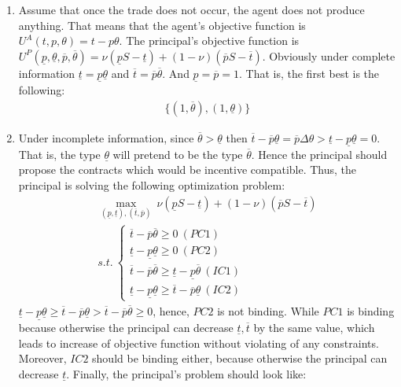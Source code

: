 \documentclass[a4paper]{article}
\begin{document}
\begin{enumerate}
	\item Assume that once the trade does not occur, the agent does not produce anything. That means that the agent's objective function is $U^A(t, p, \theta) = t - p \theta$. The principal's objective function is $U^P(\underline{p}, \underline{\theta}, \overline{p}, \overline{\theta}) = \nu(\underline{p}S - \underline{t}) + (1 - \nu)(\overline{p}S - \overline{t})$. Obviously under complete information $\underline{t} = \underline{p}\underline{\theta}$ and $\overline{t} = \overline{p}\overline{\theta}$. And $\underline{p} = \overline{p} = 1$. That is, the first best is the following:
	\begin{align*}
	\{(1, \overline{\theta}), (1, \underline{\theta})\}
	\end{align*}
	\item Under incomplete information, since $\overline{\theta} > \underline{\theta}$ then $\overline{t} - \overline{p}\underline{\theta} = \overline{p} \Delta \theta > \underline{t} - \underline{p}\underline{\theta} = 0$. That is, the type $\underline{\theta}$ will pretend to be the type $\overline{\theta}$. Hence the principal should propose the contracts which would be incentive compatible. Thus, the principal is solving the following optimization problem:
	\begin{align*}
	\underset{(\underline{p}, \underline{t}), (\overline{t}, \overline{p})}{\max}\ \nu(\underline{p}S - \underline{t}) + (1 - \nu)(\overline{p}S - \overline{t})\\
	s.t.\ \begin{cases}
	\overline{t} - \overline{p} \overline{\theta} \ge 0\ (PC1)\\
	\underline{t} - \underline{p} \underline{\theta} \ge 0\ (PC2)\\
	\overline{t} - \overline{p} \overline{\theta} \ge \underline{t} - \underline{p} \overline{\theta}\ (IC1)\\
	\underline{t} - \underline{p} \underline{\theta} \ge \overline{t} - \overline{p} \underline{\theta}\ (IC2)
	\end{cases}
	\end{align*}
	$\underline{t} - \underline{p}\underline{\theta} \ge \overline{t} - \overline{p}\underline{\theta} > \overline{t} - \overline{p}\overline{\theta} \ge 0$, hence, $PC2$ is not binding. While $PC1$ is binding because otherwise the principal can decrease $\underline{t}, \overline{t}$ by the same value, which leads to increase of objective function without violating of any constraints. Moreover, $IC2$ should be binding either, because otherwise the principal can decrease $\underline{t}$. Finally, the principal's problem should look like:

\end{enumerate}
\end{document}
